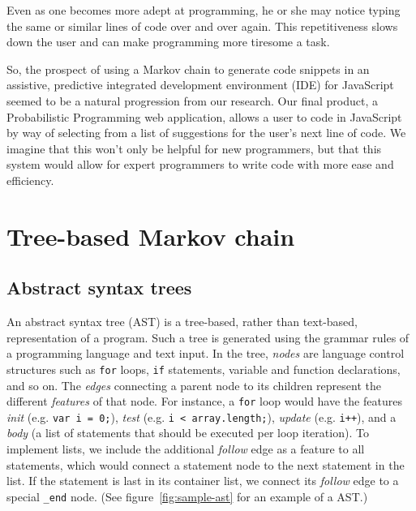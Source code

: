 \documentclass[titlepage]{article}
\begin{document}
Even as one becomes more
adept at programming, he or she may notice typing the same or
similar lines of code over and over again. This repetitiveness slows down
the user and can make programming more tiresome a task.

So, the prospect of using a Markov chain to generate code snippets in an assistive, predictive integrated development environment (IDE) for JavaScript seemed to be a natural progression from our research. Our final product, a Probabilistic Programming
web application, allows a user to code in JavaScript by way of selecting from
a list of suggestions for the user's next line of code. We imagine that this won't only be helpful for new programmers,
but that this system would allow for expert programmers to write code with more ease and efficiency.


\section{Tree-based Markov chain}

\subsection{Abstract syntax trees}

An abstract syntax tree (AST) is a tree-based, rather than text-based, representation of a program.
Such a tree is generated using the grammar rules of a programming language and text input. In the tree, \emph{nodes}
are language control structures such as {\tt for} loops, {\tt if} statements, variable and function
declarations, and so on. The \emph{edges} connecting a parent node to its children represent the different \emph{features}
of that node. For instance, a {\tt for} loop would have the features \emph{init} (e.g. {\tt var i = 0;}),
\emph{test} (e.g. {\tt i < array.length;}), \emph{update} (e.g. {\tt i++}), and a \emph{body} (a list
of statements that should be executed per loop iteration). To implement lists, we include the additional
\emph{follow} edge as a feature to all statements, which would connect a statement node to the next statement
in the list. If the statement is last in its container list, we connect its \emph{follow} edge to a special
{\tt {\_end}} node. (See figure~\ref{fig:sample-ast} for an example of a AST.)


\end{document}
